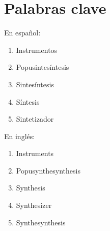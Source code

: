 \documentclass[../candidatura.tex]{subfiles}
\begin{document}
\section{Palabras clave}


En español:

\begin{enumerate}
    \item Instrumentos
    \item Popusintesíntesis
    \item Sintesíntesis
    \item Síntesis
    \item Sintetizador
\end{enumerate}


\medskip
En inglés:

\begin{enumerate}
    \item Instruments
    \item Popusynthesynthesis
    \item Synthesis
    \item Synthesizer
    \item Synthesynthesis
\end{enumerate}
\end{document}

